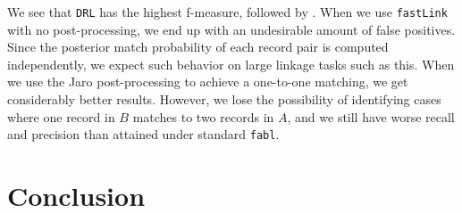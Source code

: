 \documentclass[12pt,letterpaper]{article}
\newcommand{\1}[1]{\mathbb{I}\!\left[#1\right]} %
\begin{document}
We see that \texttt{DRL} has the highest f-measure, followed by . When we use \texttt{fastLink} with no post-processing, we end up with an undesirable amount of false positives. Since the posterior match probability of each record pair is computed independently, we expect such behavior on large linkage tasks such as this. When we use the Jaro post-processing to achieve a one-to-one matching, we get considerably better results. However, we lose the possibility of identifying cases where one record in $B$ matches to two records in $A$, and we still have worse recall and precision than attained under standard \texttt{fabl}.


\section{Conclusion}

\end{document}

